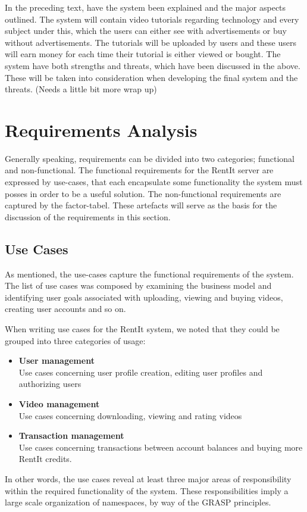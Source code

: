 In the preceding text, have the system been explained and the major aspects outlined. The system will contain video tutorials regarding technology and every subject under this, which the users can either see with advertisements or buy without advertisements. The tutorials will be uploaded by users and these users will earn money for each time their tutorial is either viewed or bought.
The system have both strengths and threats, which have been discussed in the above. These will be taken into consideration when developing the final system and the threats.
(Needs a little bit more wrap up)

\section{Requirements Analysis}
Generally speaking, requirements can be divided into two categories; functional and non-functional. The functional requirements for the RentIt server are expressed by use-cases, that each encapsulate some functionality the system must posses in order to be a useful solution. The non-functional requirements are captured by the factor-tabel.
  These artefacts will serve as the basis for the discussion of the requirements in this section.
\subsection{Use Cases}
As mentioned, the use-cases capture the functional requirements of the system. The list of use cases was composed by examining the business model and identifying user goals associated with uploading, viewing and buying videos, creating user accounts and so on.

When writing use cases for the RentIt system, we noted that they could be grouped into three categories of usage:
\begin{itemize}
\item \textbf{User management}\\
Use cases concerning user profile creation, editing user profiles and authorizing users
\item \textbf{Video management}\\
Use cases concerning downloading, viewing and rating videos
\item \textbf{Transaction management}\\
Use cases concerning transactions between account balances and buying more RentIt credits.
\end{itemize}
In other words, the use cases reveal at least three major areas of responsibility within the required functionality of the system. These responsibilities imply a large scale organization of namespaces, by way of the GRASP principles.

